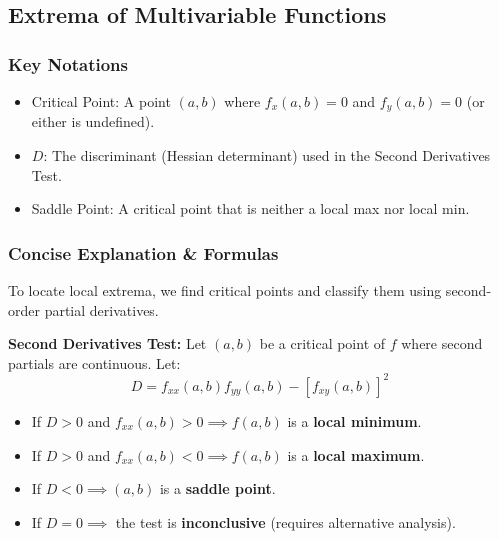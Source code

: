 \documentclass[11pt]{article}
\begin{document}
\subsection{Extrema of Multivariable Functions}
\subsubsection*{Key Notations}
\begin{itemize}
    \item Critical Point: A point $(a,b)$ where $f_x(a,b)=0$ and $f_y(a,b)=0$ (or either is undefined).
    \item $D$: The discriminant (Hessian determinant) used in the Second Derivatives Test.
    \item Saddle Point: A critical point that is neither a local max nor local min.
\end{itemize}

\subsubsection*{Concise Explanation \& Formulas}
To locate local extrema, we find critical points and classify them using second-order partial derivatives.
\begin{formulabox}
    \textbf{Second Derivatives Test:} Let $(a,b)$ be a critical point of $f$ where second partials are continuous. Let:
    \[ D = f_{xx}(a,b)f_{yy}(a,b) - [f_{xy}(a,b)]^2 \]
    \begin{itemize}
        \item If $D > 0$ and $f_{xx}(a,b) > 0 \implies f(a,b)$ is a \textbf{local minimum}.
        \item If $D > 0$ and $f_{xx}(a,b) < 0 \implies f(a,b)$ is a \textbf{local maximum}.
        \item If $D < 0 \implies (a,b)$ is a \textbf{saddle point}.
        \item If $D = 0 \implies$ the test is \textbf{inconclusive} (requires alternative analysis).
    \end{itemize}
\end{formulabox}
\end{document}
